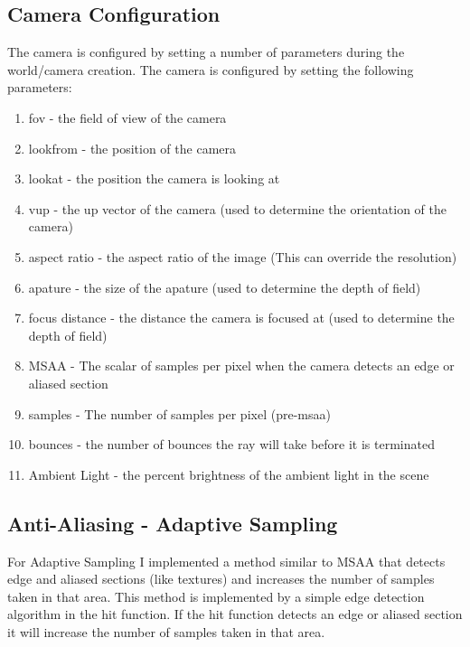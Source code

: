 \documentclass{article}
\begin{document}
    \subsection{Camera Configuration}
    The camera is configured by setting a number of parameters during the world/camera creation. The camera is configured by setting the following parameters: \par
    \begin{enumerate}
        \item fov - the field of view of the camera
        \item lookfrom - the position of the camera
        \item lookat - the position the camera is looking at
        \item vup - the up vector of the camera (used to determine the orientation of the camera)
        \item aspect ratio - the aspect ratio of the image (This can override the resolution)
        \item apature - the size of the apature (used to determine the depth of field)
        \item focus distance - the distance the camera is focused at (used to determine the depth of field)
        \item MSAA - The scalar of samples per pixel when the camera detects an edge or aliased section 
        \item samples - The number of samples per pixel (pre-msaa)
        \item bounces - the number of bounces the ray will take before it is terminated
        \item Ambient Light - the percent brightness of the ambient light in the scene 
    \end{enumerate}



    \subsection{Anti-Aliasing - Adaptive Sampling}
    For Adaptive Sampling I implemented a method similar to MSAA that detects edge and aliased sections (like textures) and increases the number of samples taken in that area. This method is implemented by a simple edge detection algorithm in the hit function. If the hit function detects an edge or aliased section it will increase the number of samples taken in that area. \par
\end{document}
